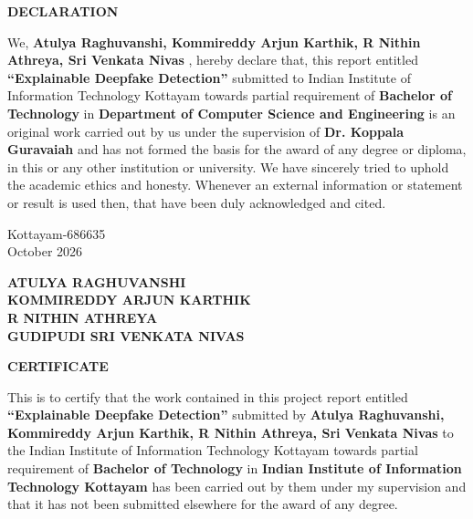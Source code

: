 \documentclass[12pt,a4wide]{report}
\theoremstyle{plain}
\theoremstyle{definition}
\theoremstyle{remark}
\begin{document}
\clearpage
 \setcounter{page}{2}
\begin{center}
{\large{\bf{DECLARATION}}}
\end{center}


\noindent We, \textbf{Atulya Raghuvanshi, Kommireddy Arjun Karthik, R Nithin Athreya, Sri Venkata Nivas} , hereby declare that, this report entitled
\textbf{``Explainable Deepfake Detection''} submitted to Indian
Institute of Information Technology Kottayam towards partial
requirement of {\bf Bachelor of Technology} in \textbf{Department of Computer Science and Engineering}
is an original work carried out by us under the supervision of
\textbf{Dr. Koppala Guravaiah} and has not formed the basis for the award
of any degree or diploma, in this or any other institution or
university. We have sincerely tried to uphold the academic ethics
and honesty. Whenever an external information or statement or
result is used then, that have been duly acknowledged and cited.

\vspace{4cm}

\noindent
\begin{minipage}[t]{0.45\textwidth}
Kottayam-686635\\[10pt]
October 2026
\end{minipage}
\hfill
\begin{minipage}[t]{0.6\textwidth}
\raggedleft
\textbf{ATULYA RAGHUVANSHI}\\

\textbf{KOMMIREDDY ARJUN KARTHIK}\\

\textbf{R NITHIN ATHREYA}\\

\textbf{GUDIPUDI SRI VENKATA NIVAS}
\end{minipage}

\clearpage

\clearpage


 \setcounter{page}{3}
\begin{center}
{\large{\bf{CERTIFICATE}}}
\end{center}


\noindent This is to certify that the work contained in this
project report entitled \textbf{``Explainable Deepfake Detection''}
submitted by \textbf{Atulya Raghuvanshi, Kommireddy Arjun Karthik, R Nithin Athreya, Sri Venkata Nivas} to the Indian Institute of Information Technology Kottayam
towards partial requirement of {\bf Bachelor of
Technology} in
\textbf{Indian Institute of Information Technology Kottayam} has been carried out by them under my
supervision and that it has not been submitted elsewhere for the
award of any degree.
\end{document}
